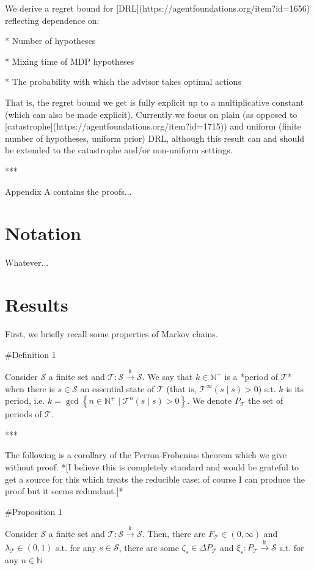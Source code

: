 \documentclass[a4paper]{article}
\newcommand{\AC}[1]{\left\{#1\right\}}
\newcommand{\Nats}{\mathbb{N}}
\newcommand{\M}{\xrightarrow{\text{k}}}
\newcommand{\St}{\mathcal{S}}
\newcommand{\T}{\mathcal{T}}
\newcommand{\Pd}{P}
\begin{document}
We derive a regret bound for [DRL](https://agentfoundations.org/item?id=1656) reflecting dependence on:

* Number of hypotheses

* Mixing time of MDP hypotheses

* The probability with which the advisor takes optimal actions

That is, the regret bound we get is fully explicit up to a multiplicative constant (which can also be made explicit). Currently we focus on plain (as opposed to [catastrophe](https://agentfoundations.org/item?id=1715)) and uniform (finite number of hypotheses, uniform prior) DRL, although this result can and should be extended to the catastrophe and/or non-uniform settings.

***

Appendix A contains the proofs...

\section{Notation}

Whatever...

\section{Results}

First, we briefly recall some properties of Markov chains.

\#Definition 1

Consider $\St$ a finite set and $\T: \St \M \St$. We say that $k \in \Nats^+$ is a *period of $\T$* when there is $s \in \St$ an essential state of $\T$ (that is, $\T^\infty(s \mid s) > 0$) s.t. $k$ is its period, i.e. $k = \gcd \AC{n \in \Nats^+ \mid \T^n(s \mid s) > 0}$. We denote $\Pd_\T$ the set of periods of $\T$.

***

The following is a corollary of the Perron-Frobenius theorem which we give without proof. *[I believe this is completely standard and would be grateful to get a source for this which treats the reducible case; of course I can produce the proof but it seems redundant.]*

\#Proposition 1

Consider $\St$ a finite set and $\T: \St \M \St$. Then, there are $F_\T \in (0,\infty)$ and $\lambda_\T\in(0,1)$ s.t. for any $s \in \St$, there are some $\zeta_s \in \Delta\Pd_\T$ and $\xi_s: \Pd_\T \M \St$ s.t. for any $n \in \Nats$
\end{document}
